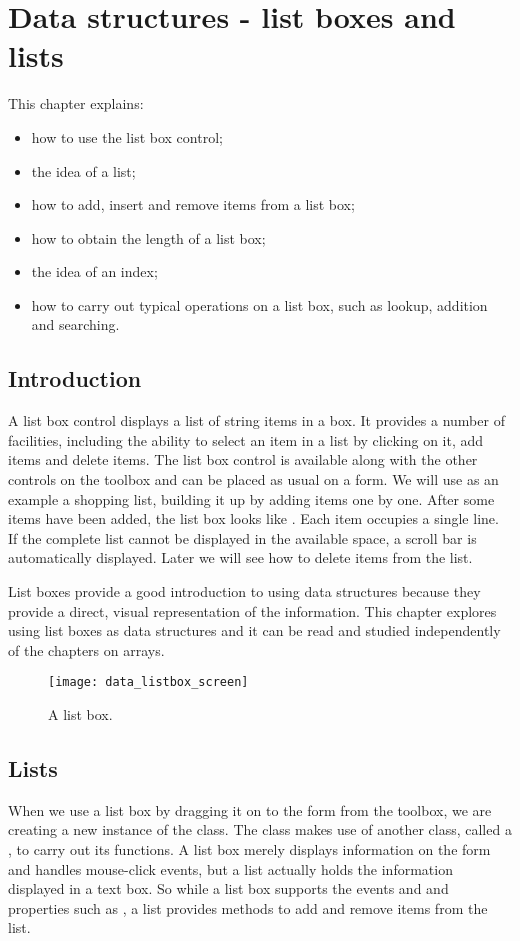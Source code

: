 \chapter{Data structures - list boxes and lists}
	\label{ch:data-structures}

	This chapter explains:
	\begin{itemize}
    \item how to use the list box control;
    \item the idea of a list;
    \item how to add, insert and remove items from a list box;
    \item how to obtain the length of a list box;
    \item the idea of an index;
    \item how to carry out typical operations on a list box, such as lookup, addition and searching.
	\end{itemize}


  \section{Introduction}
		A list box control displays a list of string items in a box. It provides a number of facilities, including the ability to select an item in a list by clicking on it, add items and delete items. The list box control is available along with the other controls on the toolbox and can be placed as usual on a form. We will use as an example a shopping list, building it up by adding items one by one. After some items have been added, the list box looks like . Each item occupies a single line. If the complete list cannot be displayed in the available space, a scroll bar is automatically displayed. Later we will see how to delete items from the list.
		
		List boxes provide a good introduction to using data structures because they provide a direct, visual representation of the information. This chapter explores using list boxes as data structures and it can be read and studied independently of the chapters on arrays.

		\begin{figure}[bth]
			\centering
			\texttt{[image: data\_listbox\_screen]}
			\caption{A list box.}
			\label{fig:data_listbox_screen}
		\end{figure}

  \section{Lists}
		When we use a list box by dragging it on to the form from the toolbox, we are creating a new instance of the  class. The  class makes use of another class, called a , to carry out its functions. A list box merely displays information on the form and handles mouse-click events, but a list actually holds the information displayed in a text box. So while a list box supports the events  and  and properties such as , a list provides methods to add and remove items from the list.
		
